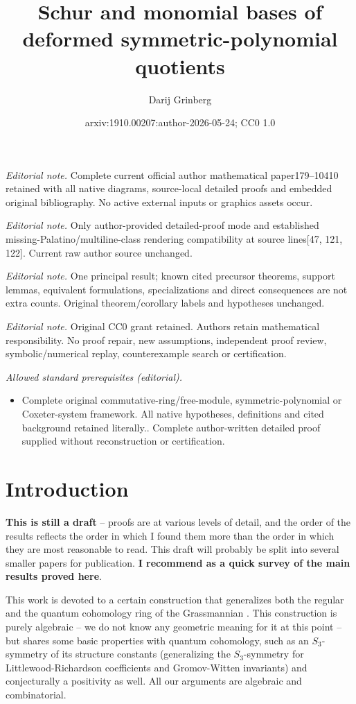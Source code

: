 \documentclass[numbers=enddot,12pt,final,onecolumn,notitlepage]{scrartcl}%
\title{Schur and monomial bases of deformed symmetric-polynomial quotients}
\author{Darij Grinberg}
\date{arxiv:1910.00207:author-2026-05-24; CC0 1.0}
\theoremstyle{definition}
\begin{document}
\maketitle
\noindent\textit{Editorial note.} Complete current official author mathematical paper179--10410 retained with all native diagrams, source-local detailed proofs and embedded original bibliography. No active external inputs or graphics assets occur.\par\medskip
\noindent\textit{Editorial note.} Only author-provided detailed-proof mode and established missing-Palatino/multiline-class rendering compatibility at source lines[47, 121, 122]. Current raw author source unchanged.\par\medskip
\noindent\textit{Editorial note.} One principal result; known cited precursor theorems, support lemmas, equivalent formulations, specializations and direct consequences are not extra counts. Original theorem/corollary labels and hypotheses unchanged.\par\medskip
\noindent\textit{Editorial note.} Original CC0 grant retained. Authors retain mathematical responsibility. No proof repair, new assumptions, independent proof review, symbolic/numerical replay, counterexample search or certification.\par\medskip
\noindent\textit{Allowed standard prerequisites (editorial).}\begin{itemize}
\item Complete original commutative-ring/free-module, symmetric-polynomial or Coxeter-system framework. All native hypotheses, definitions and cited background retained literally.. Complete author-written detailed proof supplied without reconstruction or certification.
\end{itemize}\medskip
\section{Introduction}

\textbf{This is still a draft }-- proofs are at various levels of detail, and
the order of the results reflects the order in which I found them more than
the order in which they are most reasonable to read. This draft will probably
be split into several smaller papers for publication. \textbf{I recommend
\cite{Grinbe19} as a quick survey of the main results proved here}.

This work is devoted to a certain construction that generalizes both the
regular and the quantum cohomology ring of the Grassmannian \cite{Postni05}.
This construction is purely algebraic -- we do not know any geometric meaning
for it at this point -- but shares some basic properties with quantum
cohomology, such as an $S_{3}$-symmetry of its structure constants
(generalizing the $S_{3}$-symmetry for Littlewood-Richardson coefficients and
Gromov-Witten invariants) and conjecturally a positivity as well. All our
arguments are algebraic and combinatorial.
\end{document}
